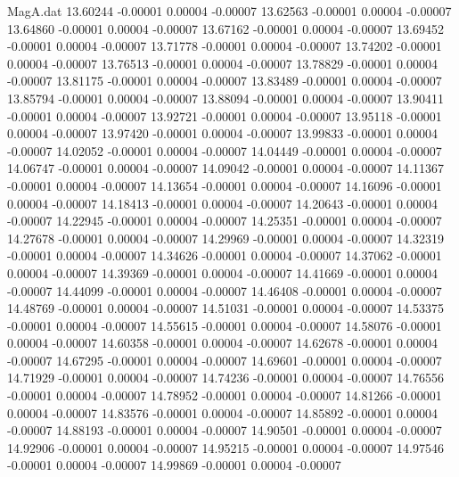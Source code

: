 \begin{filecontents}{MagA.dat}
  13.60244   -0.00001    0.00004   -0.00007
  13.62563   -0.00001    0.00004   -0.00007
  13.64860   -0.00001    0.00004   -0.00007
  13.67162   -0.00001    0.00004   -0.00007
  13.69452   -0.00001    0.00004   -0.00007
  13.71778   -0.00001    0.00004   -0.00007
  13.74202   -0.00001    0.00004   -0.00007
  13.76513   -0.00001    0.00004   -0.00007
  13.78829   -0.00001    0.00004   -0.00007
  13.81175   -0.00001    0.00004   -0.00007
  13.83489   -0.00001    0.00004   -0.00007
  13.85794   -0.00001    0.00004   -0.00007
  13.88094   -0.00001    0.00004   -0.00007
  13.90411   -0.00001    0.00004   -0.00007
  13.92721   -0.00001    0.00004   -0.00007
  13.95118   -0.00001    0.00004   -0.00007
  13.97420   -0.00001    0.00004   -0.00007
  13.99833   -0.00001    0.00004   -0.00007
  14.02052   -0.00001    0.00004   -0.00007
  14.04449   -0.00001    0.00004   -0.00007
  14.06747   -0.00001    0.00004   -0.00007
  14.09042   -0.00001    0.00004   -0.00007
  14.11367   -0.00001    0.00004   -0.00007
  14.13654   -0.00001    0.00004   -0.00007
  14.16096   -0.00001    0.00004   -0.00007
  14.18413   -0.00001    0.00004   -0.00007
  14.20643   -0.00001    0.00004   -0.00007
  14.22945   -0.00001    0.00004   -0.00007
  14.25351   -0.00001    0.00004   -0.00007
  14.27678   -0.00001    0.00004   -0.00007
  14.29969   -0.00001    0.00004   -0.00007
  14.32319   -0.00001    0.00004   -0.00007
  14.34626   -0.00001    0.00004   -0.00007
  14.37062   -0.00001    0.00004   -0.00007
  14.39369   -0.00001    0.00004   -0.00007
  14.41669   -0.00001    0.00004   -0.00007
  14.44099   -0.00001    0.00004   -0.00007
  14.46408   -0.00001    0.00004   -0.00007
  14.48769   -0.00001    0.00004   -0.00007
  14.51031   -0.00001    0.00004   -0.00007
  14.53375   -0.00001    0.00004   -0.00007
  14.55615   -0.00001    0.00004   -0.00007
  14.58076   -0.00001    0.00004   -0.00007
  14.60358   -0.00001    0.00004   -0.00007
  14.62678   -0.00001    0.00004   -0.00007
  14.67295   -0.00001    0.00004   -0.00007
  14.69601   -0.00001    0.00004   -0.00007
  14.71929   -0.00001    0.00004   -0.00007
  14.74236   -0.00001    0.00004   -0.00007
  14.76556   -0.00001    0.00004   -0.00007
  14.78952   -0.00001    0.00004   -0.00007
  14.81266   -0.00001    0.00004   -0.00007
  14.83576   -0.00001    0.00004   -0.00007
  14.85892   -0.00001    0.00004   -0.00007
  14.88193   -0.00001    0.00004   -0.00007
  14.90501   -0.00001    0.00004   -0.00007
  14.92906   -0.00001    0.00004   -0.00007
  14.95215   -0.00001    0.00004   -0.00007
  14.97546   -0.00001    0.00004   -0.00007
  14.99869   -0.00001    0.00004   -0.00007

\end{filecontents}
